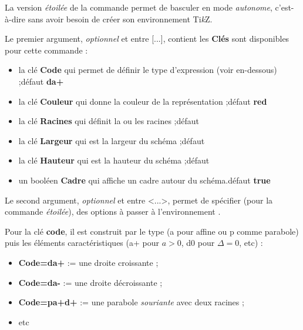 \documentclass[a4paper,french,11pt]{article}
\providecommand\tikzlogo{Ti\textit{k}Z}
\let\TikZ\tikzlogo
\newcommand\ctex[1]{\tcbox[vignettelatex]{#1}}
\newcommand\cmaj[1]{%
	{\tcbox[vignetteMaJ]{#1}\xspace}%
}
\newcommand\Cle[1]{{\bfseries\sffamily\textlangle #1\textrangle}}
\begin{document}
\begin{cautionblock}
\cmaj{2.1.9} La version \textit{étoilée} de la commande permet de basculer en mode \textit{autonome}, c'est-à-dire sans avoir besoin de créer son environnement \TikZ.

\smallskip

Le premier argument, \textit{optionnel} et entre \textsf{[...]}, contient les \Cle{Clés} sont disponibles pour cette commande :

\begin{itemize}
	\item la clé \Cle{Code} qui permet de définir le type d'expression (voir en-dessous) ;\hfill{}défaut \Cle{da+}
	\item la clé \Cle{Couleur} qui donne la couleur de la représentation ;\hfill{}défaut \Cle{red}
	\item la clé \Cle{Racines} qui définit la ou les racines ;\hfill{}défaut \Cle{2}
	\item la clé \Cle{Largeur} qui est la largeur du schéma ;\hfill{}défaut \Cle{2}
	\item la clé \Cle{Hauteur} qui est la hauteur du schéma ;\hfill{}défaut \Cle{1}
	\item un booléen \Cle{Cadre} qui affiche un cadre autour du schéma.\hfill{}défaut \Cle{true}
\end{itemize}

Le second argument, \textit{optionnel} et entre \textsf{<...>}, permet de spécifier (pour la commande \textit{étoilée}), des options à passer à l'environnement \ctex{tikzpicture}.
\end{cautionblock}

\begin{cautionblock}
Pour la clé \Cle{code}, il est construit par le type (\textsf{a} pour affine ou \textsf{p} comme parabole) puis les éléments caractéristiques (\textsf{a+} pour $a>0$, \textsf{d0} pour $\Delta=0$, etc) :

\begin{itemize}
	\item \Cle{Code=da+} := une droite croissante ;
	\item \Cle{Code=da-} := une droite décroissante ;
	\item \Cle{Code=pa+d+} := une parabole \textit{souriante} avec deux racines ;
	\item etc
\end{itemize}
\vspace*{-\baselineskip}\leavevmode
\end{cautionblock}
\end{document}
